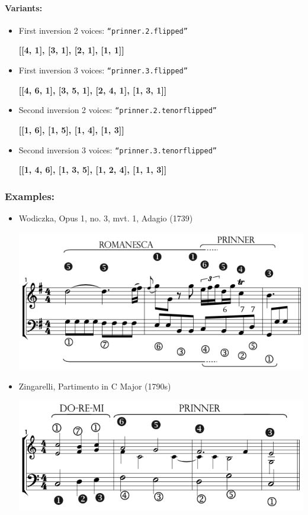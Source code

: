 ﻿\documentclass[11pt, openany]{article}
\begin{document}
\begin{itemize}
\paragraph{Variants:}
\begin{itemize}
\item First inversion 2 voices: \texttt{“prinner.2.flipped”}
	\begin{center}
	\textbf{[[4, 1], [3, 1], [2, 1], [1, 1]]}
	\end{center}
\item First inversion 3 voices: \texttt{“prinner.3.flipped”}
	\begin{center}
	\textbf{[[4, 6, 1], [3, 5, 1], [2, 4, 1], [1, 3, 1]]}
	\end{center}
\item Second inversion 2 voices: \texttt{“prinner.2.tenorflipped”}
	\begin{center}
	\textbf{[[1, 6], [1, 5], [1, 4], [1, 3]]}
	\end{center}
\item Second inversion 3 voices: \texttt{“prinner.3.tenorflipped”}
	\begin{center}
	\textbf{[[1, 4, 6], [1, 3, 5], [1, 2, 4], [1, 1, 3]]}
	\end{center}
\end{itemize}

\subsubsection{Examples:}
\begin{itemize}
\item Wodiczka, Opus 1, no. 3, mvt. 1, Adagio (1739)
\begin{center}
\includegraphics[scale=0.5]{wodiczka1c.png}
\end{center}
\item Zingarelli, Partimento in C Major (1790s)
\begin{center}
\includegraphics[scale=0.5]{zingarelliparti.png}
\end{center}
\end{itemize}



\end{itemize}
\end{document}
